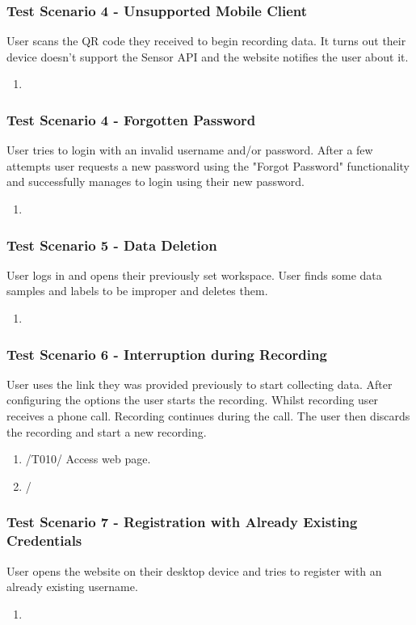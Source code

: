 \subsubsection{Test Scenario 4 - Unsupported Mobile Client}
User scans the QR code they received to begin recording data. It turns out their device doesn't support the Sensor API and the website notifies the user about it.
\begin{enumerate}
    \item 
\end{enumerate}
\subsubsection{Test Scenario 4 - Forgotten Password}
User tries to login with an invalid username and/or password. After a few attempts user requests a new password using the "Forgot Password" functionality and successfully manages to login using their new password.
\begin{enumerate}
    \item 
\end{enumerate} 
\subsubsection{Test Scenario 5 - Data Deletion} 
User logs in and opens their previously set workspace. User finds some data samples and labels to be improper and deletes them.
\begin{enumerate}
    \item 
\end{enumerate}
\subsubsection{Test Scenario 6 - Interruption during Recording}
User uses the link they was provided previously to start collecting data. After configuring the options the user starts the recording. Whilst recording user receives a phone call. Recording continues during the call. The user then discards the recording and start a new recording. 
\begin{enumerate}
    \item /T010/ Access web page.
    \item /
\end{enumerate}
\subsubsection{Test Scenario 7 - Registration with Already Existing Credentials}
User opens the website on their desktop device and tries to register with an already existing username.
\begin{enumerate}
    \item 
\end{enumerate}
